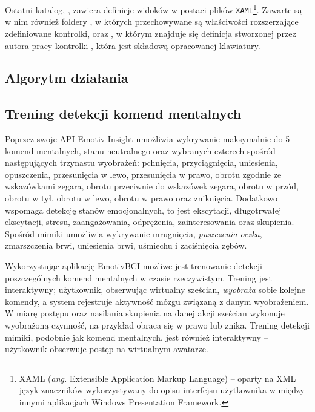 \documentclass[skorowidz,skroty]{dyplomWEZUT}
\begin{document}
Ostatni katalog, , zawiera definicje widoków w postaci plików \lstinline[language={[Sharp]C}]{XAML}\footnote{XAML (\textit{ang.} Extensible Application Markup Language) -- oparty na XML język znaczników wykorzystywany do opisu interfejsu użytkownika w między innymi aplikacjach Windows Presentation Framework.}. Zawarte są w nim również foldery , w których przechowywane są właściwości rozszerzające zdefiniowane kontrolki, oraz , w którym znajduje się definicja stworzonej przez autora pracy kontrolki , która jest składową opracowanej klawiatury.  


\subsection{Algorytm działania}
\subsection{Trening detekcji komend mentalnych}
Poprzez swoje API Emotiv Insight umożliwia wykrywanie maksymalnie do 5 komend mentalnych, stanu neutralnego oraz wybranych czterech spośród następujących trzynastu wyobrażeń: pchnięcia, przyciągnięcia, uniesienia, opuszczenia, przesunięcia w lewo, przesunięcia w prawo, obrotu zgodnie ze wskazówkami zegara, obrotu przeciwnie do wskazówek zegara, obrotu w przód, obrotu w tył, obrotu w lewo, obrotu w prawo oraz zniknięcia. Dodatkowo wspomaga detekcję stanów emocjonalnych, to jest ekscytacji, długotrwałej ekscytacji, stresu, zaangażowania, odprężenia, zainteresowania oraz skupienia. Spośród mimiki umożliwia wykrywanie mrugnięcia, \textit{puszczenia oczka}, zmarszczenia brwi, uniesienia brwi, uśmiechu i zaciśnięcia zębów.

Wykorzystując aplikację EmotivBCI możliwe jest trenowanie detekcji poszczególnych komend mentalnych w czasie rzeczywistym. Trening jest interaktywny; użytkownik, obserwując wirtualny sześcian, \textit{wyobraża} sobie kolejne komendy, a system rejestruje aktywność mózgu związaną z danym wyobrażeniem. W miarę postępu oraz nasilania skupienia na danej akcji sześcian wykonuje wyobrażoną czynność, na przykład obraca się w prawo lub znika. Trening detekcji mimiki, podobnie jak komend mentalnych, jest również interaktywny -- użytkownik obserwuje postęp na wirtualnym awatarze. 
\end{document}
